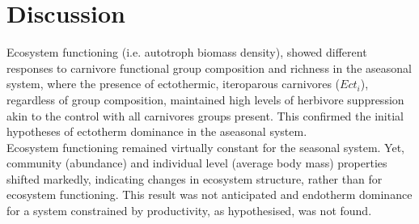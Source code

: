 \chapter{Discussion}
\label{chap:dis}
%
Ecosystem functioning (i.e. autotroph biomass density), showed  different responses to carnivore functional group composition and richness in the aseasonal system, where the presence of ectothermic, iteroparous carnivores ($Ect_i$), regardless of group composition, maintained high levels of herbivore suppression akin to the control with all carnivores groups present. This confirmed the initial hypotheses of ectotherm dominance in the aseasonal system. \\
Ecosystem functioning remained virtually constant for the seasonal system. Yet, community (abundance) and individual level (average body mass) properties shifted markedly, indicating changes in ecosystem structure, rather than for ecosystem functioning. This result was not anticipated and endotherm dominance for a system constrained by productivity, as hypothesised, was not found. \\
 


